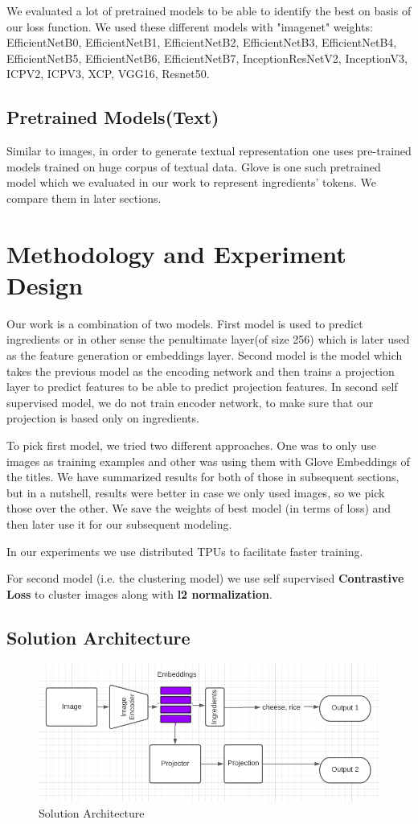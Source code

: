 \documentclass{article}
\begin{document}
We evaluated a lot of pretrained models to be able to identify the best on basis of our loss function. We used these different models with "imagenet" weights: EfficientNetB0, EfficientNetB1, EfficientNetB2, EfficientNetB3, EfficientNetB4, EfficientNetB5, EfficientNetB6, EfficientNetB7, InceptionResNetV2, InceptionV3, ICPV2, ICPV3, XCP, VGG16, Resnet50.

\subsection{Pretrained Models(Text)}
Similar to images, in order to generate textual representation one uses pre-trained models trained on huge corpus of textual data. Glove is one such pretrained model which we evaluated in our work to represent ingredients' tokens. 
We compare them in later sections.

\section{Methodology and Experiment Design}
Our work is a combination of two models. First model is used to predict ingredients or in other sense the penultimate layer(of size 256) which is later used as the feature generation or embeddings layer. Second model is the model which takes the previous model as the encoding network and then trains a projection layer to predict features to be able to predict projection features. In second self supervised model, we do not train encoder network, to make sure that our projection is based only on ingredients. 

To pick first model, we tried two different approaches. One was to only use images as training examples and other was using them with Glove Embeddings of the titles. We have summarized results for both of those in subsequent sections, but in a nutshell, results were better in case we only used images, so we pick those over the other. We save the weights of best model (in terms of loss) and then later use it for our subsequent modeling.

In our experiments we use distributed TPUs to facilitate faster training.

For second model (i.e. the clustering model) we use self supervised \textbf{Contrastive Loss} to cluster images along with \textbf{l2 normalization}.
\subsection{Solution Architecture}
\begin{figure}[H]
\includegraphics[width=5in]{Screenshot from 2021-12-10 18-59-47.png}
\caption{Solution Architecture}
\end{figure}
\end{document}
